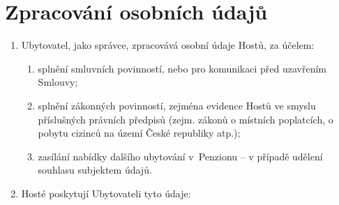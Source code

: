 \documentclass[a4paper]{scrartcl}
\begin{document}
\section{Zpracování osobních údajů}

\begin{enumerate}

  \item
        Ubytovatel, jako správce, zpracovává osobní údaje Hostů, za účelem:

        \begin{enumerate}

          \item
                splnění smluvních povinností, nebo pro komunikaci před uzavřením
                Smlouvy;
          \item
                splnění zákonných povinností, zejména evidence Hostů ve smyslu
                příslušných právních předpisů (zejm. zákonů o místních poplatcích,
                o pobytu cizinců na území České republiky atp.);
          \item
                zasílání nabídky dalšího ubytování v~Penzionu -- v případě udělení
                souhlasu subjektem údajů.
        \end{enumerate}
  \item
        Hosté poskytují Ubytovateli tyto údaje:

        \begin{enumerate}


\end{enumerate}
\end{enumerate}
\end{document}
